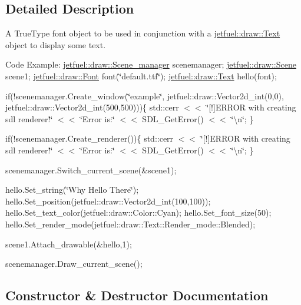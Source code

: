 \subsection{Detailed Description}
A True\+Type font object to be used in conjunction with a \hyperlink{classjetfuel_1_1draw_1_1Text}{jetfuel\+::draw\+::\+Text} object to display some text.

Code Example\+: \hyperlink{classjetfuel_1_1draw_1_1Scene__manager}{jetfuel\+::draw\+::\+Scene\+\_\+manager} scenemanager; \hyperlink{classjetfuel_1_1draw_1_1Scene}{jetfuel\+::draw\+::\+Scene} scene1; \hyperlink{classjetfuel_1_1draw_1_1Font}{jetfuel\+::draw\+::\+Font} font(\char`\"{}default.\+ttf\char`\"{}); \hyperlink{classjetfuel_1_1draw_1_1Text}{jetfuel\+::draw\+::\+Text} hello(font);

if(!scenemanager.Create\+\_\+window(\char`\"{}example\char`\"{}, jetfuel\+::draw\+::\+Vector2d\+\_\+int(0,0), jetfuel\+::draw\+::\+Vector2d\+\_\+int(500,500)))\{ std\+::cerr $<$$<$ \char`\"{}\mbox{[}!\mbox{]}\+E\+R\+R\+O\+R with creating sdl renderer!\char`\"{} $<$$<$ \char`\"{}\+Error is\+:\char`\"{} $<$$<$ S\+D\+L\+\_\+\+Get\+Error() $<$$<$ \char`\"{}\textbackslash{}n\char`\"{}; \}

if(!scenemanager.Create\+\_\+renderer())\{ std\+::cerr $<$$<$ \char`\"{}\mbox{[}!\mbox{]}\+E\+R\+R\+O\+R with creating sdl renderer!\char`\"{} $<$$<$ \char`\"{}\+Error is\+:\char`\"{} $<$$<$ S\+D\+L\+\_\+\+Get\+Error() $<$$<$ \char`\"{}\textbackslash{}n\char`\"{}; \}

scenemanager.\+Switch\+\_\+current\+\_\+scene(\&scene1);

hello.\+Set\+\_\+string(\char`\"{}\+Why Hello There\char`\"{}); hello.\+Set\+\_\+position(jetfuel\+::draw\+::\+Vector2d\+\_\+int(100,100)); hello.\+Set\+\_\+text\+\_\+color(jetfuel\+::draw\+::\+Color\+::\+Cyan); hello.\+Set\+\_\+font\+\_\+size(50); hello.\+Set\+\_\+render\+\_\+mode(jetfuel\+::draw\+::\+Text\+::\+Render\+\_\+mode\+::\+Blended);

scene1.\+Attach\+\_\+drawable(\&hello,1);

scenemanager.\+Draw\+\_\+current\+\_\+scene(); 

\subsection{Constructor \& Destructor Documentation}
\mbox{\label{classjetfuel_1_1draw_1_1Font_a1054eb031ce0e8485f828f5ae7463770}} 
